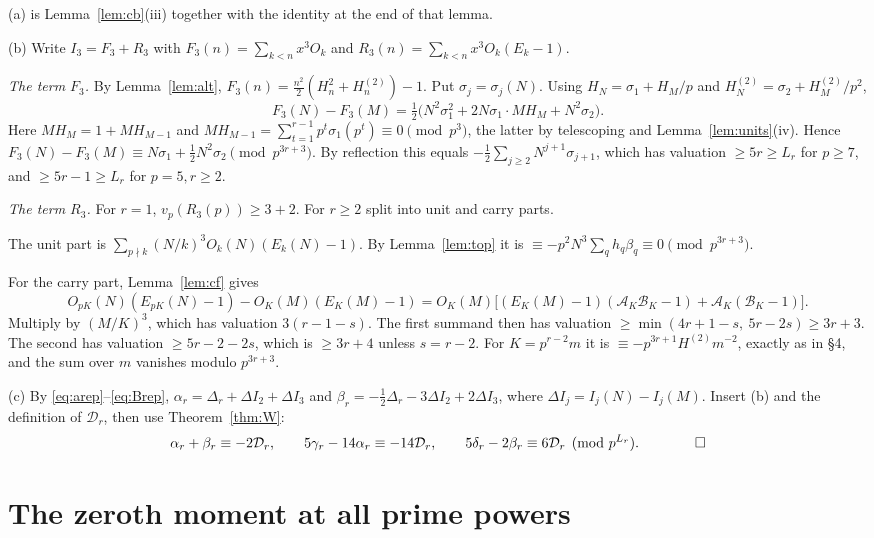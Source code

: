 \documentclass[11pt]{amsart}
\theoremstyle{definition}
\theoremstyle{remark}
\newcommand{\vp}{v_p}
\begin{document}
(a) is Lemma~\ref{lem:cb}(iii) together with the identity at the end of that lemma.

(b) Write $I_3=F_3+R_3$ with $F_3(n)=\sum_{k<n}x^3O_k$ and
$R_3(n)=\sum_{k<n}x^3O_k(E_k-1)$.

\emph{The term $F_3$.} By Lemma~\ref{lem:alt},
$F_3(n)=\frac{n^2}{2}(H_n^2+H_n^{(2)})-1$. Put $\sigma_j=\sigma_j(N)$. Using
$H_N=\sigma_1+H_M/p$ and $H_N^{(2)}=\sigma_2+H_M^{(2)}/p^2$,
\[
F_3(N)-F_3(M)=\tfrac12\bigl(N^2\sigma_1^2+2N\sigma_1\cdot MH_M+N^2\sigma_2\bigr).
\]
Here $MH_M=1+MH_{M-1}$ and $MH_{M-1}=\sum_{t=1}^{r-1}p^t\sigma_1(p^t)\equiv0\pmod{p^3}$, the
latter by telescoping and Lemma~\ref{lem:units}(iv). Hence
$F_3(N)-F_3(M)\equiv N\sigma_1+\frac12N^2\sigma_2\pmod{p^{3r+3}}$. By reflection this equals
$-\frac12\sum_{j\ge2}N^{j+1}\sigma_{j+1}$, which has valuation $\ge5r\ge L_r$ for $p\ge7$,
and $\ge5r-1\ge L_r$ for $p=5,r\ge2$.

\emph{The term $R_3$.} For $r=1$, $\vp(R_3(p))\ge3+2$. For $r\ge2$ split into unit and carry
parts.

The unit part is $\sum_{p\nmid k}(N/k)^3O_k(N)(E_k(N)-1)$. By Lemma~\ref{lem:top} it is
$\equiv-p^2N^3\sum_qh_q\beta_q\equiv0\pmod{p^{3r+3}}$.

For the carry part, Lemma~\ref{lem:cf} gives
\[
O_{pK}(N)(E_{pK}(N)-1)-O_K(M)(E_K(M)-1)=O_K(M)\bigl[(E_K(M)-1)(\mathcal A_K\mathcal B_K-1)+\mathcal A_K(\mathcal B_K-1)\bigr].
\]
Multiply by $(M/K)^3$, which has valuation $3(r-1-s)$. The first summand then has valuation
$\ge\min(4r+1-s,\ 5r-2s)\ge3r+3$. The second has valuation $\ge5r-2-2s$, which is
$\ge3r+4$ unless $s=r-2$. For $K=p^{r-2}m$ it is $\equiv-p^{3r+1}H^{(2)}m^{-2}$, exactly as in
\S4, and the sum over $m$ vanishes modulo $p^{3r+3}$.

(c) By \eqref{eq:arep}--\eqref{eq:Brep},
$\alpha_r=\Delta_r+\Delta I_2+\Delta I_3$ and
$\beta_r=-\frac12\Delta_r-3\Delta I_2+2\Delta I_3$, where $\Delta I_j=I_j(N)-I_j(M)$.
Insert (b) and the definition of $\mathcal D_r$, then use Theorem~\ref{thm:W}:
\[
\alpha_r+\beta_r\equiv-2\mathcal D_r,\qquad 5\gamma_r-14\alpha_r\equiv-14\mathcal D_r,\qquad
5\delta_r-2\beta_r\equiv6\mathcal D_r\pmod{p^{L_r}}.\qquad\qed
\]

\section{The zeroth moment at all prime powers}\label{sec:nu-new}
\end{document}
